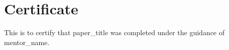 \section*{Certificate}This is to certify that {{paper_title}} was completed under the guidance of {{mentor_name}}.
